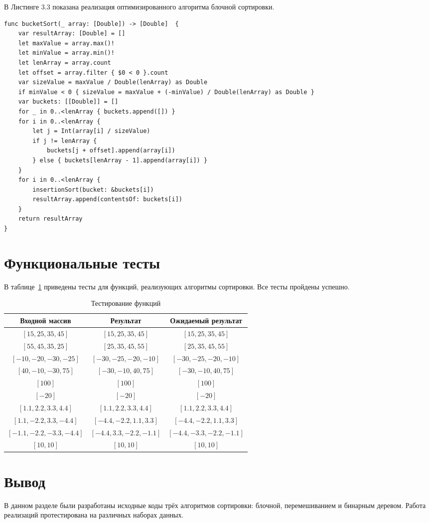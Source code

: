 \hspace{0.6cm}В Листинге 3.3 показана реализация оптимизированного алгоритма блочной сортировки.
\begin{lstlisting}[caption=Функция алгоритма блочной сортировки]
func bucketSort(_ array: [Double]) -> [Double]  {
    var resultArray: [Double] = []
    let maxValue = array.max()!
    let minValue = array.min()!
    let lenArray = array.count
    let offset = array.filter { $0 < 0 }.count
    var sizeValue = maxValue / Double(lenArray) as Double
    if minValue < 0 { sizeValue = maxValue + (-minValue) / Double(lenArray) as Double }
    var buckets: [[Double]] = []
    for _ in 0..<lenArray { buckets.append([]) }
    for i in 0..<lenArray {
        let j = Int(array[i] / sizeValue)
        if j != lenArray {
            buckets[j + offset].append(array[i])
        } else { buckets[lenArray - 1].append(array[i]) }
    }
    for i in 0..<lenArray {
        insertionSort(bucket: &buckets[i])
        resultArray.append(contentsOf: buckets[i])
    }
    return resultArray
}
\end{lstlisting}

\section{Функциональные тесты}

В таблице~\ref{tbl:test} приведены тесты для функций, реализующих алгоритмы сортировки. Все тесты пройдены успешно.

\begin{table}[h!]
	\begin{center}
		\begin{tabular}{|c|c|c|}
			\hline
			Входной массив & Результат & Ожидаемый результат \\ 
			\hline
			$[15, 25, 35, 45]$ & $[15, 25, 35, 45]$  & $[15, 25, 35, 45]$\\\hline
			$[55, 45, 35, 25]$  & $[25, 35, 45, 55]$ & $[25, 35, 45, 55]$\\\hline
			$[-10, -20, -30, -25]$  & $[-30, -25, -20, -10]$  & $[-30, -25, -20, -10]$\\\hline
			$[40, -10, -30, 75]$  & $[-30, -10, 40, 75]$  & $[-30, -10, 40, 75]$\\\hline
			$[100]$  & $[100]$  & $[100]$\\\hline
			$[-20]$  & $[-20]$  & $[-20]$\\\hline
			$[1.1, 2.2, 3.3, 4.4]$  & $[1.1, 2.2, 3.3, 4.4]$  & $[1.1, 2.2, 3.3, 4.4]$\\\hline
			$[1.1, -2.2, 3.3, -4.4]$  & $[-4.4, -2.2, 1.1, 3.3]$  &  $[-4.4, -2.2, 1.1, 3.3]$\\\hline
			$[-1.1, -2.2, -3.3, -4.4]$  & $[-4.4, 3.3, -2.2, -1.1]$  &  $[-4.4, -3.3, -2.2, -1.1]$\\\hline
			$[10, 10]$  & $[10, 10]$  & $[10, 10]$ \\\hline
		\end{tabular}
		\caption{\label{tbl:test}Тестирование функций}
	\end{center}
\end{table}

\section{Вывод}

В данном разделе были разработаны исходные коды трёх алгоритмов сортировки: блочной, перемешиванием и бинарным деревом. Работа реализаций протестирована на различных наборах данных.
